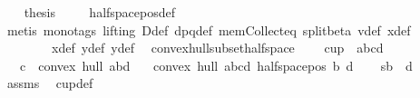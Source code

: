 \begin{isabellebody}
\ \ \isamarkupfalse%
\ {\isacharquery}{\kern0pt}thesis\ \isamarkupfalse%
\ {}\ \isamarkupfalse%
\ halfspace{\isacharunderscore}{\kern0pt}pos{\isacharunderscore}{\kern0pt}def\isanewline
\ \ \ \ \isamarkupfalse%
\ {\isacharparenleft}{\kern0pt}metis\ {\isacharparenleft}{\kern0pt}mono{\isacharunderscore}{\kern0pt}tags{\isacharcomma}{\kern0pt}\ lifting{\isacharparenright}{\kern0pt}\ D{\isacharunderscore}{\kern0pt}def\ dpq{\isacharunderscore}{\kern0pt}def\ mem{\isacharunderscore}{\kern0pt}Collect{\isacharunderscore}{\kern0pt}eq\ split{\isacharunderscore}{\kern0pt}beta\ v{\isacharunderscore}{\kern0pt}def\ x{}{\isacharunderscore}{\kern0pt}def\ \isanewline
\ \ \ \ \ \ \ \ x{}{\isacharunderscore}{\kern0pt}def\ y{}{\isacharunderscore}{\kern0pt}def\ y{}{\isacharunderscore}{\kern0pt}def{\isacharparenright}{\kern0pt}\ \isanewline
{}\isamarkupfalse%
%
\endisatagproof
{\isafoldproof}%
%
\isadelimproof
\isanewline
%
\endisadelimproof
\isanewline
{}\isamarkupfalse%
\ convex{\isacharunderscore}{\kern0pt}hull{\isacharunderscore}{\kern0pt}subset{\isacharunderscore}{\kern0pt}halfspace{}{\isacharcolon}{\kern0pt}\ \isanewline
\ \ \ {\isachardoublequoteopen}cup\ {}\ {\isacharbrackleft}{\kern0pt}a{\isacharcomma}{\kern0pt}b{\isacharcomma}{\kern0pt}c{\isacharcomma}{\kern0pt}d{\isacharbrackright}{\kern0pt}{\isachardoublequoteclose}\isanewline
\ \ \ {\isachardoublequoteopen}c\ {\isasymin}\ convex\ hull\ {\isacharbraceleft}{\kern0pt}a{\isacharcomma}{\kern0pt}b{\isacharcomma}{\kern0pt}d{\isacharbraceright}{\kern0pt}{\isachardoublequoteclose}\isanewline
\ \ \ {\isachardoublequoteopen}convex\ hull\ {\isacharbraceleft}{\kern0pt}a{\isacharcomma}{\kern0pt}b{\isacharcomma}{\kern0pt}c{\isacharcomma}{\kern0pt}d{\isacharbraceright}{\kern0pt}{\isasymsubseteq}\ halfspace{\isacharunderscore}{\kern0pt}pos\ b\ d{\isachardoublequoteclose}\isanewline
%
\isadelimproof
%
\endisadelimproof
%
\isatagproof
{}\isamarkupfalse%
{\isacharminus}{\kern0pt}\isanewline
\ \ \isamarkupfalse%
\ s{\isacharunderscore}{\kern0pt}{}{\isacharcolon}{\kern0pt}{\isachardoublequoteopen}b\ {\isasymnoteq}\ d{\isachardoublequoteclose}\ \isamarkupfalse%
\ assms{\isacharparenleft}{\kern0pt}{}{\isacharparenright}{\kern0pt}\ \isamarkupfalse%
\ cup{\isacharunderscore}{\kern0pt}def\ \isamarkupfalse%

\end{isabellebody}
